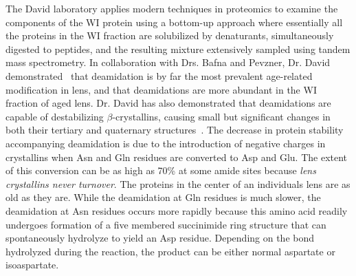 \documentclass[arial,11pt]{article}
\begin{document}
The David laboratory applies modern techniques in proteomics to examine the components of the WI protein using a bottom-up approach where essentially all the proteins in the WI fraction are solubilized by denaturants, simultaneously digested to peptides, and the resulting mixture extensively sampled using tandem mass spectrometry.  In collaboration with Drs. Bafna and Pevzner, Dr. David demonstrated~\cite{Wilmarth06} that deamidation is by far the most prevalent age-related modification in lens, and that deamidations are more abundant in the WI fraction of aged lens.  Dr. David 
has also demonstrated that deamidations are capable of destabilizing $\beta$-crystallins, causing small but significant changes in both their tertiary and quaternary structures~\cite{takata10}. The decrease in protein stability accompanying deamidation is due to the introduction of negative charges in crystallins when Asn and Gln residues are converted to Asp and Glu.  The extent of this conversion can be as high as 70\% at some amide sites because {\em lens crystallins never turnover}.  The proteins in the center of an individuals lens are as old as they are.  While the deamidation at Gln residues is much slower, the deamidation at Asn residues occurs more rapidly because this amino acid readily undergoes formation of a five membered succinimide ring structure that can spontaneously hydrolyze to yield an Asp residue.  Depending on the bond hydrolyzed during the reaction, the product can be either normal aspartate or isoaspartate.  
\end{document}
